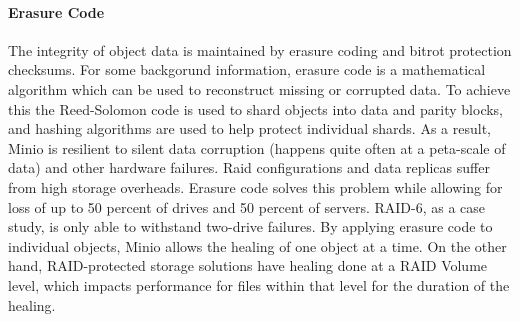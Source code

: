 \documentclass{article}
\begin{document}
\paragraph{Erasure Code}
The integrity of object data is maintained by erasure coding and bitrot protection checksums. For some backgorund information, erasure code is a mathematical algorithm which can be used to reconstruct missing or corrupted data. To achieve this the Reed-Solomon code is used to shard objects into data and parity blocks, and hashing algorithms are used to help protect individual shards. As a result, Minio is resilient to silent data corruption (happens quite often at a peta-scale of data) and other hardware failures. Raid configurations and data replicas suffer from high storage overheads. Erasure code solves this problem while allowing for loss of up to 50 percent of drives and 50 percent of servers. RAID-6, as a case study, is only able to withstand two-drive failures. By applying erasure code to individual objects, Minio allows the healing of one object at a time. On the other hand, RAID-protected storage solutions have healing done at a RAID Volume level, which impacts performance for files within that level for the duration of the healing. 
\end{document}
